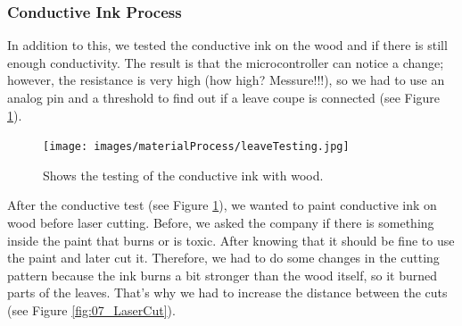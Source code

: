 \documentclass[04.3_buildingProcess.tex]{subfiles}
\begin{document}
    \subsubsection{Conductive Ink Process}

    \noindent
    In addition to this, we tested the conductive ink on the wood and if there is still enough 
    conductivity. The result is that the microcontroller can notice a change; 
    however, the resistance is very high (how high? Messure!!!), so we had to use an analog pin 
    and a threshold to find out if a leave coupe is connected (see Figure \ref{fig:leaveConductiveInk}).

    \begin{figure}[h!]
        \centering
        \texttt{[image: images/materialProcess/leaveTesting.jpg]}
        \caption{Shows the testing of the conductive ink with wood.}
        \label{fig:leaveConductiveInk}
    \end{figure}

    \noindent
    After the conductive test (see Figure \ref{fig:leaveConductiveInk}), we wanted to paint 
    conductive ink on wood before laser cutting. Before, we asked the company if there is 
    something inside the paint that burns or is toxic. After knowing that it should be fine to 
    use the paint and later cut it. Therefore, we had to do some changes in the cutting pattern
    because the ink burns a bit stronger than the wood itself, so it burned parts of the leaves. 
    That's why we had to increase the distance between the cuts (see Figure \ref{fig:07_LaserCut}). 
\end{document}

